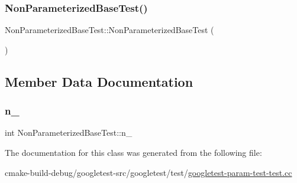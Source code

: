 \subsubsection{\texorpdfstring{NonParameterizedBaseTest()}{NonParameterizedBaseTest()}}
{\footnotesize\ttfamily Non\+Parameterized\+Base\+Test\+::\+Non\+Parameterized\+Base\+Test (\begin{DoxyParamCaption}{ }\end{DoxyParamCaption})\hspace{0.3cm}{\ttfamily [inline]}}



\subsection{Member Data Documentation}
\mbox{\label{classNonParameterizedBaseTest_a617d4bbfd2aa5f6d41eea3089f7ad039}} 
\subsubsection{\texorpdfstring{n\_}{n\_}}
{\footnotesize\ttfamily int Non\+Parameterized\+Base\+Test\+::n\+\_\+\hspace{0.3cm}{\ttfamily [protected]}}



The documentation for this class was generated from the following file\+:\begin{DoxyCompactItemize}
\item 
cmake-\/build-\/debug/googletest-\/src/googletest/test/\mbox{\hyperlink{googletest-param-test-test_8cc}{googletest-\/param-\/test-\/test.\+cc}}\end{DoxyCompactItemize}
